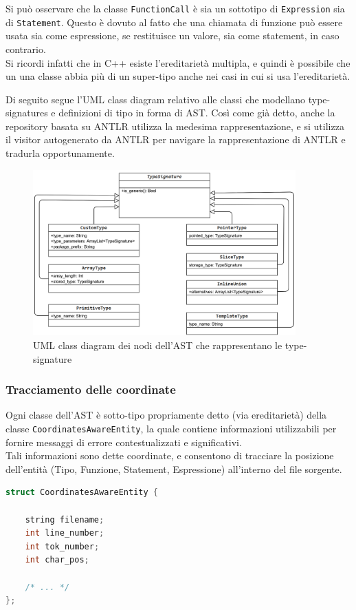 Si può osservare che la classe \texttt{FunctionCall} è sia un sottotipo di \texttt{Expression}
sia di \texttt{Statement}. Questo è dovuto al fatto che una chiamata di funzione può essere
usata sia come espressione, se restituisce un valore, sia come statement, in caso contrario. \\

Si ricordi infatti che in C++ esiste l'ereditarietà multipla, e quindi è possibile che un
una classe abbia più di un super-tipo anche nei casi in cui si usa l'ereditarietà.

\newpage

Di seguito segue l'UML class diagram relativo alle classi che modellano type-signatures e 
definizioni di tipo in forma di AST. Così come già detto, anche la repository
basata su ANTLR utilizza la medesima rappresentazione, e si utilizza il visitor
autogenerato da ANTLR per navigare la rappresentazione di ANTLR e tradurla opportunamente.

\begin{figure}[H]
    \centering
        \includegraphics[width=0.9\textwidth]{../../Assets/TypeSignatureAST.png}
    \caption{
        \centering
        UML class diagram dei nodi dell'AST che rappresentano le type-signature
    }
\end{figure}
\vspace{0.5cm}

\subsubsection{Tracciamento delle coordinate}
Ogni classe dell'AST è sotto-tipo propriamente detto (via ereditarietà) della classe \texttt{CoordinatesAwareEntity},
la quale contiene informazioni utilizzabili per fornire messaggi di errore contestualizzati e significativi. \\

Tali informazioni sono dette coordinate, e consentono di tracciare la posizione dell'entità 
(Tipo, Funzione, Statement, Espressione) all'interno del file sorgente. \\

\begin{lstlisting}[language=C++, frame=single]
struct CoordinatesAwareEntity {

    string filename;
    int line_number;
    int tok_number;
    int char_pos;

    /* ... */
};
\end{lstlisting}